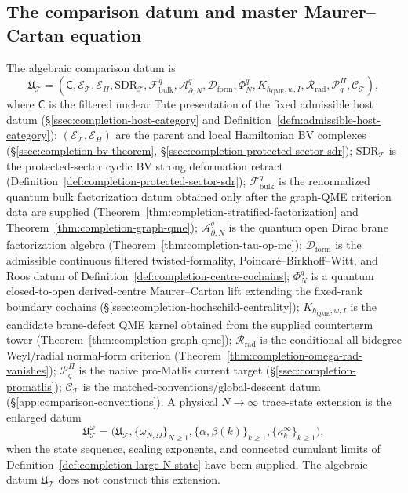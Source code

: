 \subsection{The comparison datum and master Maurer--Cartan equation}
\label{ssec:completion-universal-datum}

\begin{defn}
\label{def:completion-universal-datum}
The algebraic comparison datum is
\[
  \mathfrak U_{\mathcal T}
  =(\mathsf C,\mathcal E_{\mathcal T},\mathcal E_H,
   \mathrm{SDR}_{\mathcal T},\mathcal F^q_{\mathrm{bulk}},
   \mathcal A^q_{\partial,N},\mathcal D_{\mathrm{form}},
   \Phi^q_N,K_{\hbar_{\mathrm{QME}},w,I},
   \mathcal R_{\mathrm{rad}},\mathcal P^\Pi_q,\mathcal C_{\mathcal T}),
\]
where \(\mathsf C\) is the filtered nuclear Tate presentation of the
fixed admissible host datum
(\S\ref{ssec:completion-host-category} and
Definition~\ref{defn:admissible-host-category}); \((\mathcal E_{\mathcal T},
\mathcal E_H)\) are the parent and local Hamiltonian BV complexes
(\S\ref{ssec:completion-bv-theorem},
\S\ref{ssec:completion-protected-sector-sdr});
\(\mathrm{SDR}_{\mathcal T}\) is the protected-sector cyclic BV
strong deformation retract
(Definition~\ref{def:completion-protected-sector-sdr});
\(\mathcal F^q_{\mathrm{bulk}}\) is the renormalized quantum bulk
factorization datum obtained only after the graph-QME criterion data
are supplied
(Theorem~\ref{thm:completion-stratified-factorization} and
Theorem~\ref{thm:completion-graph-qme});
\(\mathcal A^q_{\partial,N}\) is the quantum open Dirac brane
factorization algebra
(Theorem~\ref{thm:completion-tau-op-mc});
\(\mathcal D_{\mathrm{form}}\) is the admissible continuous
filtered twisted-formality, Poincar\'e--Birkhoff--Witt, and Roos
datum of Definition~\ref{def:completion-centre-cochains};
\(\Phi^q_N\) is a quantum closed-to-open derived-centre
Maurer--Cartan lift extending the fixed-rank boundary cochains
(\S\ref{ssec:completion-hochschild-centrality});
\(K_{\hbar_{\mathrm{QME}},w,I}\)
is the candidate brane-defect QME kernel obtained from the supplied
counterterm tower
(Theorem~\ref{thm:completion-graph-qme});
\(\mathcal R_{\mathrm{rad}}\) is the conditional all-bidegree
Weyl/radial normal-form criterion
(Theorem~\ref{thm:completion-omega-rad-vanishes});
\(\mathcal P^\Pi_q\) is the native pro-Matlis current target
(\S\ref{ssec:completion-promatlis}); \(\mathcal C_{\mathcal T}\)
is the matched-conventions/global-descent datum
(\S\ref{app:comparison-conventions}).  A physical \(N\to\infty\)
trace-state extension is
the enlarged datum
\[
  \mathfrak U^\omega_{\mathcal T}
  =
  \bigl(\mathfrak U_{\mathcal T},
  \{\omega_{N,\Omega}\}_{N\ge1},
  \{\alpha,\beta(k)\}_{k\ge1},
  \{\kappa^\infty_k\}_{k\ge1}\bigr),
\]
when the state sequence, scaling exponents, and connected cumulant
limits of Definition~\ref{def:completion-large-N-state} have been
supplied.  The algebraic datum \(\mathfrak U_{\mathcal T}\) does not
construct this extension.
\end{defn}

